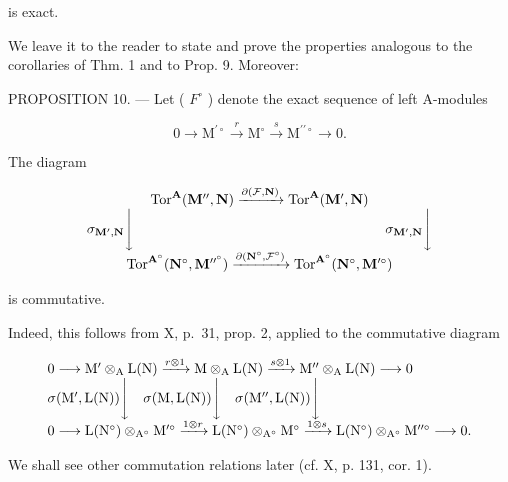 is exact.

We leave it to the reader to state and prove the properties analogous to the corollaries of Thm. 1 and to Prop. 9. Moreover:

PROPOSITION 10. --- Let ( \(F^{\circ}\) ) denote the exact sequence of left A-modules

\[
0 \rightarrow \mathrm{M} ^ {\prime \circ} \xrightarrow {r} \mathrm{M} ^ {\circ} \xrightarrow {s} \mathrm{M} ^ {\prime \prime \circ} \rightarrow 0.
\]

The diagram

\[
\begin{array}{c} \operatorname{Tor} ^ {\mathbf {A}} (\mathbf {M} ^ {\prime \prime}, \mathbf {N}) \xrightarrow {\partial (\mathcal {F} , \mathbf {N})} \operatorname{Tor} ^ {\mathbf {A}} (\mathbf {M} ^ {\prime}, \mathbf {N}) \\ \sigma_ {\mathbf {M} ^ {\prime}, \mathbf {N}} \Biggl \downarrow \qquad \qquad \qquad \qquad \qquad \qquad \qquad \qquad \qquad \sigma_ {\mathbf {M} ^ {\prime}, \mathbf {N}} \Biggl \downarrow \\ \operatorname{Tor} ^ {\mathbf {A} ^ {\circ}} (\mathbf {N} ^ {\circ}, \mathbf {M} ^ {\prime \prime^ {\circ}}) \xrightarrow {\partial (\mathbf {N} ^ {\circ} , \mathcal {F} ^ {\circ})} \operatorname{Tor} ^ {\mathbf {A} ^ {\circ}} (\mathbf {N} ^ {\circ}, \mathbf {M} ^ {\prime \circ}) \end{array}
\]

is commutative.

Indeed, this follows from X, p.~31, prop. 2, applied to the commutative diagram

\[
\begin{array}{l} 0 \longrightarrow \mathrm{M} ^ {\prime} \otimes_ {\mathrm{A}} \mathrm{L} (\mathrm{N}) \xrightarrow {r \otimes 1} \mathrm{M} \otimes_ {\mathrm{A}} \mathrm{L} (\mathrm{N}) \xrightarrow {s \otimes 1} \mathrm{M} ^ {\prime \prime} \otimes_ {\mathrm{A}} \mathrm{L} (\mathrm{N}) \longrightarrow 0 \\ \sigma (\mathrm{M} ^ {\prime}, \mathrm{L} (\mathrm{N})) \Biggl \downarrow \quad \sigma (\mathrm{M}, \mathrm{L} (\mathrm{N})) \Biggl \downarrow \quad \sigma (\mathrm{M} ^ {\prime \prime}, \mathrm{L} (\mathrm{N})) \Biggl \downarrow \\ 0 \longrightarrow \mathrm{L} (\mathrm{N} ^ {\circ}) \otimes_ {\mathrm{A} ^ {\circ}} \mathrm{M} ^ {\prime \circ} \xrightarrow {1 \otimes r} \mathrm{L} (\mathrm{N} ^ {\circ}) \otimes_ {\mathrm{A} ^ {\circ}} \mathrm{M} ^ {\circ} \xrightarrow {1 \otimes s} \mathrm{L} (\mathrm{N} ^ {\circ}) \otimes_ {\mathrm{A} ^ {\circ}} \mathrm{M} ^ {\prime \prime \circ} \longrightarrow 0. \end{array}
\]

We shall see other commutation relations later (cf. X, p. 131, cor. 1).

